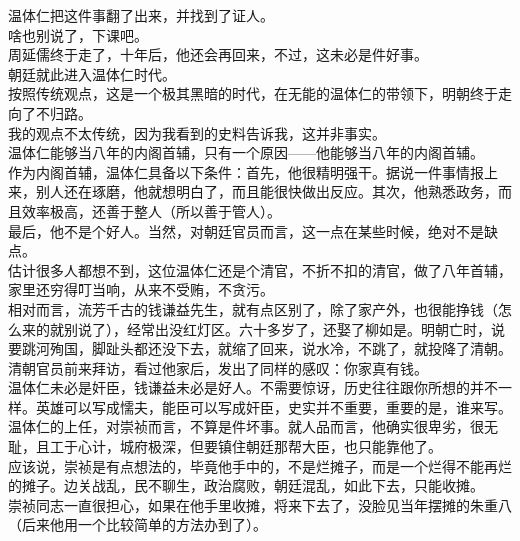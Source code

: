 \begin{multicols}{\theparacolNo}
温体仁把这件事翻了出来，并找到了证人。\\

啥也别说了，下课吧。\\

周延儒终于走了，十年后，他还会再回来，不过，这未必是件好事。\\

朝廷就此进入温体仁时代。\\

按照传统观点，这是一个极其黑暗的时代，在无能的温体仁的带领下，明朝终于走向了不归路。\\

我的观点不太传统，因为我看到的史料告诉我，这并非事实。\\

温体仁能够当八年的内阁首辅，只有一个原因——他能够当八年的内阁首辅。\\

作为内阁首辅，温体仁具备以下条件：首先，他很精明强干。据说一件事情报上来，别人还在琢磨，他就想明白了，而且能很快做出反应。其次，他熟悉政务，而且效率极高，还善于整人（所以善于管人）。\\

最后，他不是个好人。当然，对朝廷官员而言，这一点在某些时候，绝对不是缺点。\\

估计很多人都想不到，这位温体仁还是个清官，不折不扣的清官，做了八年首辅，家里还穷得叮当响，从来不受贿，不贪污。\\

相对而言，流芳千古的钱谦益先生，就有点区别了，除了家产外，也很能挣钱（怎么来的就别说了），经常出没红灯区。六十多岁了，还娶了柳如是。明朝亡时，说要跳河殉国，脚趾头都还没下去，就缩了回来，说水冷，不跳了，就投降了清朝。清朝官员前来拜访，看过他家后，发出了同样的感叹：你家真有钱。\\

温体仁未必是奸臣，钱谦益未必是好人。不需要惊讶，历史往往跟你所想的并不一样。英雄可以写成懦夫，能臣可以写成奸臣，史实并不重要，重要的是，谁来写。\\

温体仁的上任，对崇祯而言，不算是件坏事。就人品而言，他确实很卑劣，很无耻，且工于心计，城府极深，但要镇住朝廷那帮大臣，也只能靠他了。\\

应该说，崇祯是有点想法的，毕竟他手中的，不是烂摊子，而是一个烂得不能再烂的摊子。边关战乱，民不聊生，政治腐败，朝廷混乱，如此下去，只能收摊。\\

崇祯同志一直很担心，如果在他手里收摊，将来下去了，没脸见当年摆摊的朱重八（后来他用一个比较简单的方法办到了）。\\


\end{multicols}
